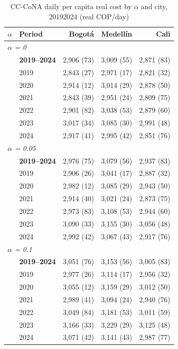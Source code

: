 \begin{table}[htbp]
\centering\small
\caption{CC-CoNA daily per capita real cost by $\alpha$ and city, 2019\textendash{}2024 (real COP/day)}
\label{tab:ccona_cost}
\begin{tabular}{llrrr}
\toprule
\multicolumn{1}{c}{$\alpha$} & Period & Bogot\'{a} & Medell\'{i}n & Cali \\
\midrule
\multicolumn{5}{l}{\textit{$\alpha$ = 0}} \\
 & \textbf{2019–2024} & 2,906 (73) & 3,009 (55) & 2,871 (83) \\
 & 2019 & 2,843 (27) & 2,971 (17) & 2,821 (32) \\
 & 2020 & 2,914 (12) & 3,014 (29) & 2,878 (50) \\
 & 2021 & 2,843 (39) & 2,951 (24) & 2,809 (75) \\
 & 2022 & 2,901 (82) & 3,038 (53) & 2,879 (60) \\
 & 2023 & 3,017 (34) & 3,085 (30) & 2,991 (48) \\
 & 2024 & 2,917 (41) & 2,995 (42) & 2,851 (76) \\
\midrule
\multicolumn{5}{l}{\textit{$\alpha$ = 0.05}} \\
 & \textbf{2019–2024} & 2,976 (75) & 3,079 (56) & 2,937 (83) \\
 & 2019 & 2,906 (26) & 3,041 (17) & 2,887 (32) \\
 & 2020 & 2,982 (12) & 3,085 (29) & 2,943 (50) \\
 & 2021 & 2,914 (40) & 3,021 (24) & 2,873 (75) \\
 & 2022 & 2,973 (83) & 3,108 (53) & 2,944 (60) \\
 & 2023 & 3,090 (33) & 3,155 (30) & 3,056 (48) \\
 & 2024 & 2,992 (42) & 3,067 (43) & 2,917 (76) \\
\midrule
\multicolumn{5}{l}{\textit{$\alpha$ = 0.1}} \\
 & \textbf{2019–2024} & 3,051 (76) & 3,153 (56) & 3,005 (83) \\
 & 2019 & 2,977 (26) & 3,114 (17) & 2,956 (32) \\
 & 2020 & 3,055 (12) & 3,159 (29) & 3,012 (50) \\
 & 2021 & 2,989 (41) & 3,094 (24) & 2,940 (76) \\
 & 2022 & 3,049 (84) & 3,181 (53) & 3,011 (59) \\
 & 2023 & 3,166 (33) & 3,229 (29) & 3,125 (48) \\
 & 2024 & 3,071 (42) & 3,141 (43) & 2,987 (77) \\

\end{tabular}
\end{table}
